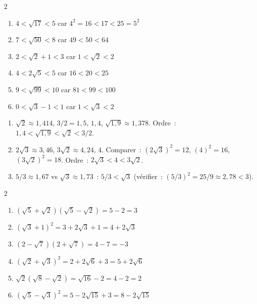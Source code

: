 
\begin{multicols}{2}
\begin{enumerate}
  \item $4<\sqrt{17}<5$ car $4^2=16<17<25=5^2$
  \item $7<\sqrt{50}<8$ car $49<50<64$
  \item $2<\sqrt{2}+1<3$ car $1<\sqrt{2}<2$
  \item $4<2\sqrt{5}<5$ car $16<20<25$
  \item $9<\sqrt{99}<10$ car $81<99<100$
  \item $0<\sqrt{3}-1<1$ car $1<\sqrt{3}<2$
\end{enumerate}
\end{multicols}


\begin{enumerate}
  \item $\sqrt{2}\approx1{,}414$, $3/2=1{,}5$, $1{,}4$, $\sqrt{1{,}9}\approx1{,}378$.
        Ordre~: $1{,}4 < \sqrt{1{,}9} < \sqrt{2} < 3/2$.
  \item $2\sqrt{3}\approx3{,}46$, $3\sqrt{2}\approx4{,}24$, $4$.
        Comparer~: $(2\sqrt{3})^2=12$, $(4)^2=16$, $(3\sqrt{2})^2=18$.
        Ordre~: $2\sqrt{3}<4<3\sqrt{2}$.
  \item $5/3\approx1{,}67$ vs $\sqrt{3}\approx1{,}73$~: $5/3<\sqrt{3}$
        (v\'erifier~: $(5/3)^2=25/9\approx2{,}78<3$).
\end{enumerate}


\begin{multicols}{2}
\begin{enumerate}
  \item $(\sqrt{5}+\sqrt{2})(\sqrt{5}-\sqrt{2})=5-2=3$
  \item $(\sqrt{3}+1)^2=3+2\sqrt{3}+1=4+2\sqrt{3}$
  \item $(2-\sqrt{7})(2+\sqrt{7})=4-7=-3$
  \item $(\sqrt{2}+\sqrt{3})^2=2+2\sqrt{6}+3=5+2\sqrt{6}$
  \item $\sqrt{2}(\sqrt{8}-\sqrt{2})=\sqrt{16}-2=4-2=2$
  \item $(\sqrt{5}-\sqrt{3})^2=5-2\sqrt{15}+3=8-2\sqrt{15}$
\end{enumerate}
\end{multicols}

